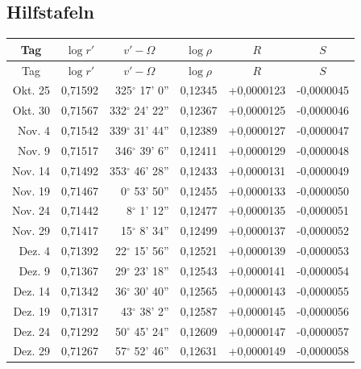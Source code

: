 \documentclass[12pt,a4paper]{article}
\begin{document}
\newpage
\subsection*{Hilfstafeln}

\begin{longtable}{|r|r|r|r|r|r|}
\hline
\multicolumn{1}{|c|}{Tag} & \multicolumn{1}{c|}{$\log r'$} & \multicolumn{1}{c|}{$v' - \Omega$} & \multicolumn{1}{c|}{$\log \rho$} & \multicolumn{1}{c|}{$R$} & \multicolumn{1}{c|}{$S$} \\
\hline
\endfirsthead
\hline
\multicolumn{1}{|c|}{Tag} & \multicolumn{1}{c|}{$\log r'$} & \multicolumn{1}{c|}{$v' - \Omega$} & \multicolumn{1}{c|}{$\log \rho$} & \multicolumn{1}{c|}{$R$} & \multicolumn{1}{c|}{$S$} \\
\hline
\endhead
\hline
\endfoot
1810 Okt. 25 & 0,71592 & 325$^\circ$ 17' 0'' & 0,12345 & +0,0000123 & -0,0000045 \\
Okt. 30 & 0,71567 & 332$^\circ$ 24' 22'' & 0,12367 & +0,0000125 & -0,0000046 \\
Nov. 4 & 0,71542 & 339$^\circ$ 31' 44'' & 0,12389 & +0,0000127 & -0,0000047 \\
Nov. 9 & 0,71517 & 346$^\circ$ 39' 6'' & 0,12411 & +0,0000129 & -0,0000048 \\
Nov. 14 & 0,71492 & 353$^\circ$ 46' 28'' & 0,12433 & +0,0000131 & -0,0000049 \\
Nov. 19 & 0,71467 & 0$^\circ$ 53' 50'' & 0,12455 & +0,0000133 & -0,0000050 \\
Nov. 24 & 0,71442 & 8$^\circ$ 1' 12'' & 0,12477 & +0,0000135 & -0,0000051 \\
Nov. 29 & 0,71417 & 15$^\circ$ 8' 34'' & 0,12499 & +0,0000137 & -0,0000052 \\
Dez. 4 & 0,71392 & 22$^\circ$ 15' 56'' & 0,12521 & +0,0000139 & -0,0000053 \\
Dez. 9 & 0,71367 & 29$^\circ$ 23' 18'' & 0,12543 & +0,0000141 & -0,0000054 \\
Dez. 14 & 0,71342 & 36$^\circ$ 30' 40'' & 0,12565 & +0,0000143 & -0,0000055 \\
Dez. 19 & 0,71317 & 43$^\circ$ 38' 2'' & 0,12587 & +0,0000145 & -0,0000056 \\
Dez. 24 & 0,71292 & 50$^\circ$ 45' 24'' & 0,12609 & +0,0000147 & -0,0000057 \\
Dez. 29 & 0,71267 & 57$^\circ$ 52' 46'' & 0,12631 & +0,0000149 & -0,0000058 \\
\hline
\end{longtable}
\end{document}
